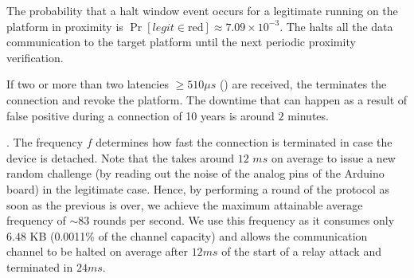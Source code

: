 The probability that a halt window event occurs for a legitimate \app running on the platform in proximity is $\Pr[legit\in\text{red}]\approx 7.09\times10^{-3}$. The \device halts all the data communication to the target platform until the next periodic proximity verification.

If two or more than two latencies $\geq 510\mu s$ (\detach) are received, the \device terminates the connection and revoke the platform. The downtime that can happen as a result of false positive during a connection of 10 years is around $2$ minutes.

\ifusenix
\vspace{-25pt}.
\else
\fi
{} The frequency $f$ determines how fast the connection is terminated in case the \device device is detached. Note that the \device takes around $12$ $ms$ on average to issue a new random challenge (by reading out the noise of the analog pins of the Arduino board) in the legitimate case. Hence, by performing a round of the protocol as soon as the previous is over, we achieve the maximum attainable average frequency of $\sim83$ rounds per second. We use this frequency as it consumes only $6.48$ KB (0.0011\% of the 
channel capacity) and allows the communication channel to be halted on average after $12 ms$ of the start of a relay attack and terminated in $24 ms$.

